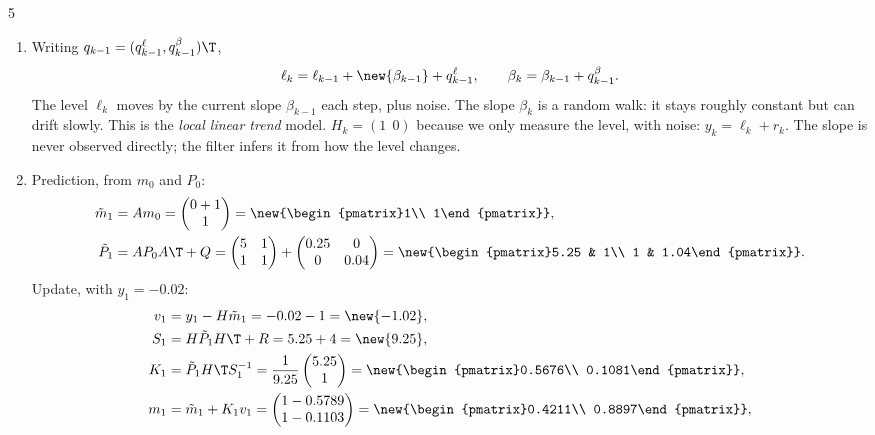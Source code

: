 \begin{homework}{5}
\soln
\begin{enumerate}[label=(\arabic*)]
\item Writing $q_{k-1} = (q^{\ell}_{k-1}, q^{\beta}_{k-1})\T$,
\[
\ell_k = \ell_{k-1} + \new{\beta_{k-1}} + q^{\ell}_{k-1}, \qquad
\beta_k = \beta_{k-1} + q^{\beta}_{k-1}.
\]
The level $\ell_k$ moves by the current slope $\beta_{k-1}$ each step, plus noise. The slope $\beta_k$ is a random walk: it stays roughly constant but can drift slowly. This is the \emph{local linear trend} model. $H_k = (1\ \ 0)$ because we only measure the level, with noise: $y_k = \ell_k + r_k$. The slope is never observed directly; the filter infers it from how the level changes.

\item Prediction, from $m_0$ and $P_0$:
\begin{align*}
\mt_1 &= Am_0 = \begin{pmatrix}0 + 1\\ 1\end{pmatrix} = \new{\begin{pmatrix}1\\ 1\end{pmatrix}},\\
\Pt_1 &= AP_0A\T + Q = \begin{pmatrix}5 & 1\\ 1 & 1\end{pmatrix} + \begin{pmatrix}0.25 & 0\\ 0 & 0.04\end{pmatrix} = \new{\begin{pmatrix}5.25 & 1\\ 1 & 1.04\end{pmatrix}}.
\end{align*}
Update, with $y_1 = -0.02$:
\begin{align*}
v_1 &= y_1 - H\mt_1 = -0.02 - 1 = \new{-1.02},\\
S_1 &= H\Pt_1H\T + R = 5.25 + 4 = \new{9.25},\\
K_1 &= \Pt_1H\T S_1^{-1} = \frac{1}{9.25}\begin{pmatrix}5.25\\ 1\end{pmatrix} = \new{\begin{pmatrix}0.5676\\ 0.1081\end{pmatrix}},\\
m_1 &= \mt_1 + K_1v_1 = \begin{pmatrix}1 - 0.5789\\ 1 - 0.1103\end{pmatrix} = \new{\begin{pmatrix}0.4211\\ 0.8897\end{pmatrix}},\\

\end{align*}
\end{enumerate}
\end{homework}
